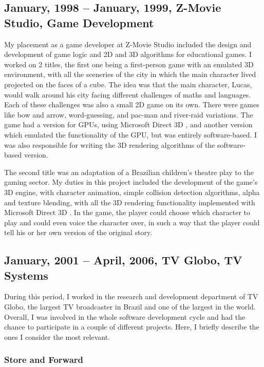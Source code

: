 \documentclass[a4paper]{article}
\begin{document}
\subsection{January, 1998 -- January, 1999, Z-Movie Studio, Game Development}

My placement as a game developer at Z-Movie Studio included the design and development of game logic and 2D and 3D algorithms for educational games. I worked on 2 titles, the first one being a first-person game with an emulated 3D environment, with all the sceneries of the city in which the main character lived projected on the faces of a cube. The idea was that the main character, Lucas, would walk around his city facing different challenges of maths and languages. Each of these challenges was also a small 2D game on its own. There were games like bow and arrow, word-guessing, and pac-man and river-raid variations. The game had a version for GPUs, using Microsoft Direct 3D , and another version which emulated the functionality of the GPU, but was entirely software-based. I was also responsible for writing the 3D rendering algorithms of the software-based version.  

The second title was an adaptation of a Brazilian children's theatre play to the gaming sector. My duties in this project included the development of the game's 3D engine, with character animation, simple collision detection algorithms, alpha and texture blending, with all the 3D rendering functionality implemented with Microsoft Direct 3D . In the game, the player could choose which character to play and could even voice the character over, in such a way that the player could tell his or her own version of the original story. 

\subsection{January, 2001 -- April, 2006, TV Globo, TV Systems}

During this period, I worked in the research and development department of TV Globo, the largest TV broadcaster in Brazil and one of the largest in the world. Overall, I was involved in the whole software development cycle and had the chance to participate in a couple of different projects. Here, I briefly describe the ones I consider the most relevant.

\subsubsection{Store and Forward}
\end{document}
